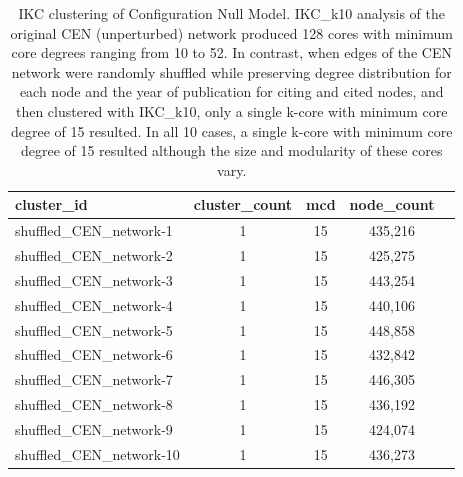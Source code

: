 \documentclass[12pt, oneside]{article}   	%
\begin{document}


\begin{table}[!h]
\centering
\captionsetup{width=0.9\textwidth}
\caption{IKC clustering of Configuration Null Model. IKC\_k10 analysis of the original CEN (unperturbed) network produced 128 cores  with minimum core degrees ranging from 10 to 52. In contrast, when edges of the CEN network were randomly shuffled while preserving degree distribution for each node and the year of publication for citing and cited nodes, and then clustered with IKC\_k10, only a single k-core with minimum core degree of 15 resulted. In all 10 cases, a single k-core with minimum core degree of 15 resulted although the size and modularity of these cores vary.}
\begin{tabular}{lcccc}
  \hline
cluster\_id & cluster\_count & mcd & node\_count  \\ 
  \hline
shuffled\_CEN\_network-1 &     1 &    15 & 435,216 \\
shuffled\_CEN\_network-2 &     1 &    15 & 425,275 \\
shuffled\_CEN\_network-3 &     1 &    15 & 443,254 \\
shuffled\_CEN\_network-4 &     1 &    15 & 440,106 \\
shuffled\_CEN\_network-5 &     1 &    15 & 448,858 \\
shuffled\_CEN\_network-6 &     1 &    15 & 432,842 \\
shuffled\_CEN\_network-7 &     1 &    15 & 446,305 \\
shuffled\_CEN\_network-8 &     1 &    15 & 436,192 \\
shuffled\_CEN\_network-9 &     1 &    15 & 424,074 \\
shuffled\_CEN\_network-10 &    1 &   15 & 436,273 \\ 
   \hline
\end{tabular}
\label{tab:tab1}
\end{table}
\end{document}
